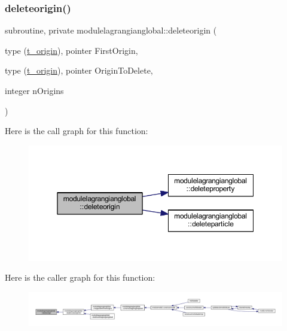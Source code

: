 \subsubsection{\texorpdfstring{deleteorigin()}{deleteorigin()}}
{\footnotesize\ttfamily subroutine, private modulelagrangianglobal\+::deleteorigin (\begin{DoxyParamCaption}\item[{type (\mbox{\hyperlink{structmodulelagrangianglobal_1_1t__origin}{t\+\_\+origin}}), pointer}]{First\+Origin,  }\item[{type (\mbox{\hyperlink{structmodulelagrangianglobal_1_1t__origin}{t\+\_\+origin}}), pointer}]{Origin\+To\+Delete,  }\item[{integer}]{n\+Origins }\end{DoxyParamCaption})\hspace{0.3cm}{\ttfamily [private]}}

Here is the call graph for this function\+:\nopagebreak
\begin{figure}[H]
\begin{center}
\leavevmode
\includegraphics[width=350pt]{namespacemodulelagrangianglobal_a47b61d17a8d0a48abe9ccb2937d67a93_cgraph}
\end{center}
\end{figure}
Here is the caller graph for this function\+:\nopagebreak
\begin{figure}[H]
\begin{center}
\leavevmode
\includegraphics[width=350pt]{namespacemodulelagrangianglobal_a47b61d17a8d0a48abe9ccb2937d67a93_icgraph}
\end{center}
\end{figure}
\mbox{\label{namespacemodulelagrangianglobal_aef9b588fe6eb57b2059f4fd96df7bd7d}} 
